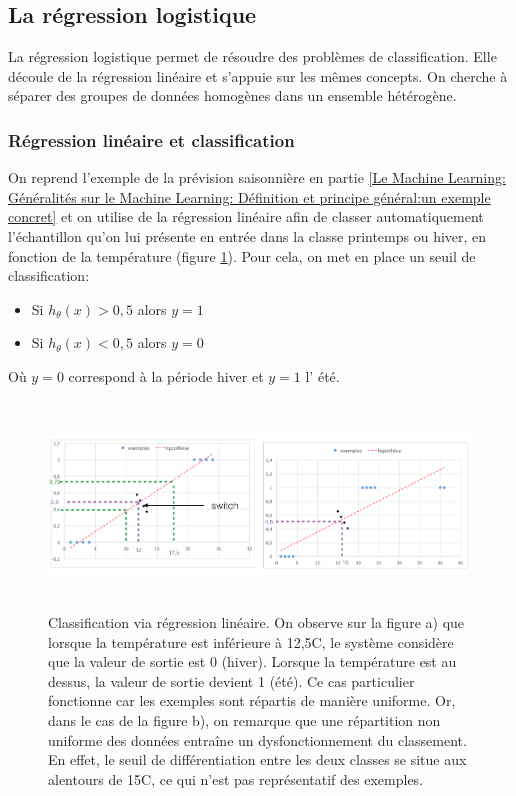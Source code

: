 \subsection{La régression logistique}
\label{Le Machine Learning: Les différents algorithmes: La regression logistique}
La régression logistique permet de résoudre des problèmes de classification. Elle découle de la régression linéaire et s'appuie sur les mêmes concepts.
On cherche à séparer des groupes de données homogènes dans un ensemble hétérogène. 

\subsubsection{Régression linéaire et classification}
\label{Le Machine Learning: Les différents algorithmes: La regression logistique: Régression linéaire et classification}
On reprend l'exemple de la prévision saisonnière en partie \ref{Le Machine Learning: Généralités sur le Machine Learning: Définition et principe général:un exemple concret} et on utilise de la régression linéaire afin de classer automatiquement l'échantillon qu'on lui présente en entrée dans la classe printemps ou hiver, en fonction de la température (figure \ref{fig:Classification via regression linéaire}). 
Pour cela, on met en place un seuil de classification:
\begin{itemize}
	\item Si $h_\theta(x) > 0,5$ alors $y=1$
	\item Si $h_\theta(x) < 0,5$ alors $y=0$
\end{itemize}

Où $y = 0$ correspond à la période hiver et $y = 1$ l' été. 

\begin{figure}[h]
	\centering\includegraphics[height=5.5cm]{images/class_reg_lineaire.png}
	\caption[Classification via régression linéaire]{Classification via régression linéaire. On observe sur la figure a) que lorsque la température est inférieure à 12,5\degres C, le système considère que la valeur de sortie est 0 (hiver). Lorsque la température est au dessus, la valeur de sortie devient 1 (été). Ce cas particulier fonctionne car les exemples sont répartis de manière uniforme. Or, dans le cas de la figure b), on remarque que une répartition non uniforme des données entraîne un dysfonctionnement du classement. En effet, le seuil de différentiation entre les deux classes se situe aux alentours de  15\degres C, ce qui n'est pas représentatif des exemples.}
	\label{fig:Classification via regression linéaire}
\end{figure}

